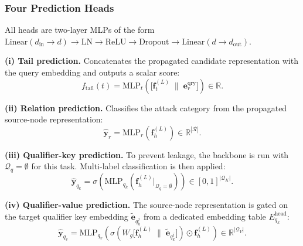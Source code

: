\documentclass[10pt,journal,compsoc]{IEEEtran}
\begin{document}
\subsubsection{Four Prediction Heads}
\label{sssec:mthr_heads}

All heads are two-layer MLPs of the form
$\mathrm{Linear}(d_{\mathrm{in}}{\to}d)
 \to \mathrm{LN} \to \mathrm{ReLU}
 \to \mathrm{Dropout} \to \mathrm{Linear}(d{\to}d_{\mathrm{out}})$.

\smallskip
\noindent\textbf{(i) Tail prediction.}
Concatenates the propagated candidate representation with
the query embedding and outputs a scalar score:
\begin{equation}
  f_{\mathrm{tail}}(t)
  = \mathrm{MLP}_t\!\left(
      \bigl[\mathbf{f}_t^{(L)}
      \;\|\; \mathbf{e}_r^{\mathrm{qry}}\bigr]
    \right) \in \mathbb{R}.
  \label{eq:mthr_tail}
\end{equation}

\smallskip
\noindent\textbf{(ii) Relation prediction.}
Classifies the attack category from the propagated
source-node representation:
\begin{equation}
  \hat{\mathbf{y}}_r
  = \mathrm{MLP}_r\!\left(\mathbf{f}_h^{(L)}\right)
  \in \mathbb{R}^{|\mathcal{R}|}.
  \label{eq:mthr_rel}
\end{equation}

\smallskip
\noindent\textbf{(iii) Qualifier-key prediction.}
To prevent leakage, the backbone is run with
$\mathcal{Q}_q{=}\emptyset$ for this task.
Multi-label classification is then applied:
\begin{equation}
  \hat{\mathbf{y}}_{q_k}
  = \sigma\!\left(
      \mathrm{MLP}_{q_k}\!\left(
        \mathbf{f}_h^{(L)}\big|_{\mathcal{Q}_q=\emptyset}
      \right)
    \right)
  \in [0,1]^{|\mathcal{Q}_K|}.
  \label{eq:mthr_qk}
\end{equation}

\smallskip
\noindent\textbf{(iv) Qualifier-value prediction.}
The source-node representation is gated on the target
qualifier key embedding $\tilde{\mathbf{e}}_{q_k^j}$
from a dedicated embedding table $E_{q_k}^{\mathrm{head}}$:
\begin{equation}
  \hat{\mathbf{y}}_{q_v}
  = \mathrm{MLP}_{q_v}\!\left(
      \sigma\!\left(
        W_g \bigl[
          \mathbf{f}_h^{(L)}
          \;\|\;
          \tilde{\mathbf{e}}_{q_k^j}
        \bigr]
      \right)
      \odot \mathbf{f}_h^{(L)}
    \right)
  \in \mathbb{R}^{|\mathcal{Q}_V|}.
  \label{eq:mthr_qv}
\end{equation}
\end{document}

